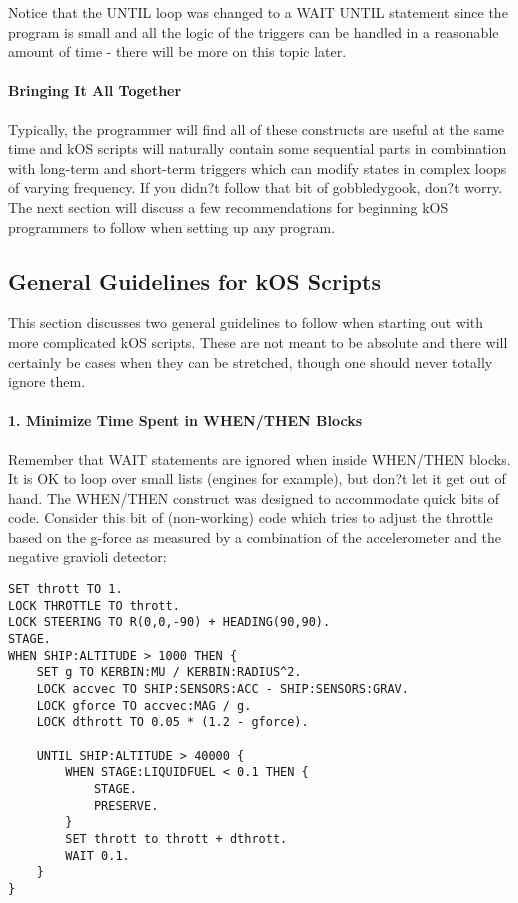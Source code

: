 Notice that the UNTIL loop was changed to a WAIT UNTIL statement since the program is small and all the logic of the triggers can be handled in a reasonable amount of time - there will be more on this topic later.

\paragraph{Bringing It All Together}
Typically, the programmer will find all of these constructs are useful at the same time and kOS scripts will naturally contain some sequential parts in combination with long-term and short-term triggers which can modify states in complex loops of varying frequency. If you didn?t follow that bit of gobbledygook, don?t worry. The next section will discuss a few recommendations for beginning kOS programmers to follow when setting up any program.

\subsection{General Guidelines for kOS Scripts}
This section discusses two general guidelines to follow when starting out with more complicated kOS scripts. These are not meant to be absolute and there will certainly be cases when they can be stretched, though one should never totally ignore them.

\paragraph{1. Minimize Time Spent in WHEN/THEN Blocks}
Remember that WAIT statements are ignored when inside WHEN/THEN blocks. It is OK to loop over small lists (engines for example), but don?t let it get out of hand. The WHEN/THEN construct was designed to accommodate quick bits of code. Consider this bit of (non-working) code which tries to adjust the throttle based on the g-force as measured by a combination of the accelerometer and the negative gravioli detector:

\begin{Verbatim}[frame=single]
SET thrott TO 1.
LOCK THROTTLE TO thrott.
LOCK STEERING TO R(0,0,-90) + HEADING(90,90).
STAGE.
WHEN SHIP:ALTITUDE > 1000 THEN {
    SET g TO KERBIN:MU / KERBIN:RADIUS^2.
    LOCK accvec TO SHIP:SENSORS:ACC - SHIP:SENSORS:GRAV.
    LOCK gforce TO accvec:MAG / g.
    LOCK dthrott TO 0.05 * (1.2 - gforce).

    UNTIL SHIP:ALTITUDE > 40000 {
        WHEN STAGE:LIQUIDFUEL < 0.1 THEN {
            STAGE.
            PRESERVE.
        }
        SET thrott to thrott + dthrott.
        WAIT 0.1.
    }
}
\end{Verbatim} 

